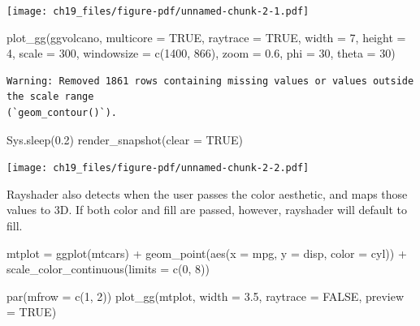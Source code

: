 \documentclass[
  letterpaper,
]{scrbook}
\newenvironment{Shaded}{\begin{snugshade}}{\end{snugshade}}
\newcommand{\AttributeTok}[1]{\textcolor[rgb]{0.40,0.45,0.13}{#1}}
\newcommand{\ConstantTok}[1]{\textcolor[rgb]{0.56,0.35,0.01}{#1}}
\newcommand{\DecValTok}[1]{\textcolor[rgb]{0.68,0.00,0.00}{#1}}
\newcommand{\FloatTok}[1]{\textcolor[rgb]{0.68,0.00,0.00}{#1}}
\newcommand{\FunctionTok}[1]{\textcolor[rgb]{0.28,0.35,0.67}{#1}}
\newcommand{\NormalTok}[1]{\textcolor[rgb]{0.00,0.23,0.31}{#1}}
\newcommand{\OtherTok}[1]{\textcolor[rgb]{0.00,0.23,0.31}{#1}}
\newcommand{\SpecialCharTok}[1]{\textcolor[rgb]{0.37,0.37,0.37}{#1}}
\begin{document}
\texttt{[image: ch19\_files/figure-pdf/unnamed-chunk-2-1.pdf]}

\begin{Shaded}
\begin{Highlighting}[]
\FunctionTok{plot\_gg}\NormalTok{(ggvolcano, }\AttributeTok{multicore =} \ConstantTok{TRUE}\NormalTok{, }\AttributeTok{raytrace =} \ConstantTok{TRUE}\NormalTok{, }\AttributeTok{width =} \DecValTok{7}\NormalTok{, }\AttributeTok{height =} \DecValTok{4}\NormalTok{, }
        \AttributeTok{scale =} \DecValTok{300}\NormalTok{, }\AttributeTok{windowsize =} \FunctionTok{c}\NormalTok{(}\DecValTok{1400}\NormalTok{, }\DecValTok{866}\NormalTok{), }\AttributeTok{zoom =} \FloatTok{0.6}\NormalTok{, }\AttributeTok{phi =} \DecValTok{30}\NormalTok{, }\AttributeTok{theta =} \DecValTok{30}\NormalTok{)}
\end{Highlighting}
\end{Shaded}

\begin{verbatim}
Warning: Removed 1861 rows containing missing values or values outside the scale range
(`geom_contour()`).
\end{verbatim}

\begin{Shaded}
\begin{Highlighting}[]
\FunctionTok{Sys.sleep}\NormalTok{(}\FloatTok{0.2}\NormalTok{)}
\FunctionTok{render\_snapshot}\NormalTok{(}\AttributeTok{clear =} \ConstantTok{TRUE}\NormalTok{)}
\end{Highlighting}
\end{Shaded}

\texttt{[image: ch19\_files/figure-pdf/unnamed-chunk-2-2.pdf]}

Rayshader also detects when the user passes the color aesthetic, and
maps those values to 3D. If both color and fill are passed, however,
rayshader will default to fill.

\begin{Shaded}
\begin{Highlighting}[]
\NormalTok{mtplot }\OtherTok{=} \FunctionTok{ggplot}\NormalTok{(mtcars) }\SpecialCharTok{+} 
  \FunctionTok{geom\_point}\NormalTok{(}\FunctionTok{aes}\NormalTok{(}\AttributeTok{x =}\NormalTok{ mpg, }\AttributeTok{y =}\NormalTok{ disp, }\AttributeTok{color =}\NormalTok{ cyl)) }\SpecialCharTok{+} 
  \FunctionTok{scale\_color\_continuous}\NormalTok{(}\AttributeTok{limits =} \FunctionTok{c}\NormalTok{(}\DecValTok{0}\NormalTok{, }\DecValTok{8}\NormalTok{))}

\FunctionTok{par}\NormalTok{(}\AttributeTok{mfrow =} \FunctionTok{c}\NormalTok{(}\DecValTok{1}\NormalTok{, }\DecValTok{2}\NormalTok{))}
\FunctionTok{plot\_gg}\NormalTok{(mtplot, }\AttributeTok{width =} \FloatTok{3.5}\NormalTok{, }\AttributeTok{raytrace =} \ConstantTok{FALSE}\NormalTok{, }\AttributeTok{preview =} \ConstantTok{TRUE}\NormalTok{)}
\end{Highlighting}
\end{Shaded}
\end{document}
